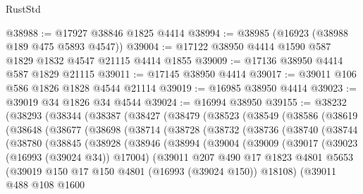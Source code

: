 \begin{lexlean}{RustStd}
\begin{coremodule}
@38988 := @17927 @38846 @1825 @4414
@38994 := @38985 (@16923 (@38988 @189 @475 @5893 @4547))
@39004 := @17122 @38950 @4414 @1590 @587 @1829 @1832 @4547 @21115 @4414 @1855
@39009 := @17136 @38950 @4414 @587 @1829 @21115
@39011 := @17145 @38950 @4414
@39017 := @39011 @106 @586 @1826 @1828 @4544 @21114
@39019 := @16985 @38950 @4414
@39023 := @39019 @34 @1826 @34 @4544
@39024 := @16994 @38950
@39155 := @38232
    (@38293
      (@38344
        (@38387
          (@38427
            (@38479
              (@38523
                (@38549
                  (@38586
                    (@38619
                      (@38648
                        (@38677
                          (@38698
                            (@38714
                              (@38728
                                (@38732
                                  (@38736
                                    (@38740
                                      (@38744
                                        (@38780
                                          (@38845
                                            (@38928
                                              (@38946
                                                (@38994
                                                  (@39004
                                                    (@39009
                                                      (@39017
                                                        (@39023 (@16993 (@39024 @34)) @17004)
                                                        (@39011
                                                          @207
                                                          @490
                                                          @17
                                                          @1823
                                                          @4801
                                                          @5653
                                                          (@39019
                                                            @150
                                                            @17
                                                            @150
                                                            @4801
                                                            (@16993 (@39024 @150))
                                                            @18108)
                                                          (@39011
                                                            @488
                                                            @108
                                                            @1600

\end{coremodule}
\end{lexlean}
